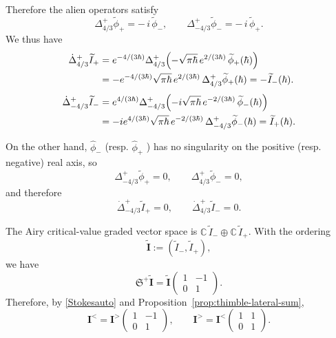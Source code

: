 \documentclass[11pt]{amsart}
\theoremstyle{plain}
\newcommand{\C}{\mathbb C}
\begin{document}
 Therefore the alien operators satisfy
\begin{equation*}
\Delta_{4/3}^{+}\widetilde\phi_+ = -\,i\,\widetilde\phi_-,
\qquad
\Delta_{-4/3}^{+}\widetilde\phi_- = -\,i\,\widetilde\phi_+.
\end{equation*}
We thus have
\begin{equation*}
\begin{aligned}
\dot\Delta_{4/3}^{+}\widetilde I_+
&=
e^{-4/(3\hbar)}\Delta_{4/3}^{+}
\Bigl(-\sqrt{\pi \hbar}\,e^{2/(3\hbar)}\,\widetilde\phi_+(\hbar)\Bigr)\\
&=
-e^{-4/(3\hbar)}
\sqrt{\pi \hbar}\,e^{2/(3\hbar)}\,\Delta_{4/3}^{+}\widetilde\phi_+(\hbar)
=
-\widetilde I_-(\hbar).
\\[0.1cm]
\dot\Delta_{-4/3}^{+}\widetilde I_-
&=
e^{4/(3\hbar)}\Delta_{-4/3}^{+}
\Bigl(-i\sqrt{\pi \hbar}\,e^{-2/(3\hbar)}\,\widetilde\phi_-(\hbar)\Bigr)\\
&=
-ie^{4/(3\hbar)}
\sqrt{\pi \hbar}\,e^{-2/(3\hbar)}\,\Delta_{-4/3}^{+}\widetilde\phi_-(\hbar)
=
\widetilde I_+(\hbar).
\end{aligned}
\end{equation*}

On the other hand, \(\widehat{\phi}_-\) (resp. \(\widehat{\phi}_+\)  ) has no singularity on the positive (resp. negative) real axis, so
\begin{equation*}
\Delta_{-4/3}^{+}\widetilde\phi_+=0,\qquad 
\Delta_{4/3}^{+}\widetilde\phi_-=0,
\end{equation*}
and therefore
\begin{equation*}
\dot\Delta_{-4/3}^{+}\widetilde I_+=0, \qquad
\dot\Delta_{4/3}^{+}\widetilde I_-=0.
\end{equation*}

 The Airy critical-value graded vector space is $ \C\,\widetilde I_- \oplus \C\,\widetilde I_+ $. With the ordering \[ \widetilde{\mathbf I}:=(\widetilde I_-,\widetilde I_+),\] we have
\[
\mathfrak S^{+}\widetilde{\mathbf I}
=
\widetilde{\mathbf I}
\begin{pmatrix}
1&-1\\
0&1
\end{pmatrix}.
\]
Therefore, by \eqref{Stokesauto} and Proposition~\ref{prop:thimble-lateral-sum},
\begin{equation*}
\mathbf I^{<}=\mathbf I^{>}
\begin{pmatrix}
1&-1\\
0&1
\end{pmatrix},
\qquad
\mathbf I^{>}=\mathbf I^{<}
\begin{pmatrix}
1&1\\
0&1
\end{pmatrix}.
\end{equation*}
\end{document}

